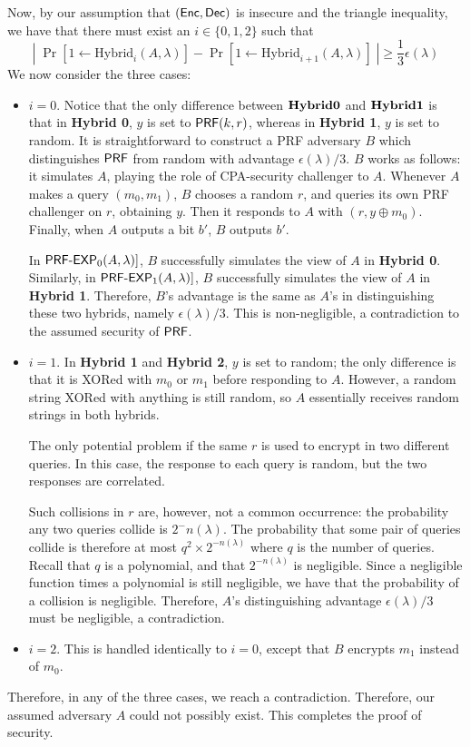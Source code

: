 Now, by our assumption that $({\sf Enc},{\sf Dec})$ is insecure and the triangle inequality, we have that there must exist an $i\in\{0,1,2\}$ such that 
\[|\;\Pr[1\gets\text{Hybrid}_i(A,\lambda)]-\Pr[1\gets\text{Hybrid}_{i+1}(A,\lambda)]\;|\geq \frac{1}{3}\epsilon(\lambda)\]
We now consider the three cases:
\begin{itemize}
	\item $i=0$.  Notice that the only difference between ${\bf Hybrid 0}$ and ${\bf Hybrid 1}$ is that in {\bf Hybrid 0}, $y$ is set to ${\sf PRF}(k,r)$, whereas in {\bf Hybrid 1}, $y$ is set to random.  It is straightforward to construct a PRF adversary $B$ which distinguishes ${\sf PRF}$ from random with advantage $\epsilon(\lambda)/3$.  $B$ works as follows: it simulates $A$, playing the role of CPA-security challenger to $A$.  Whenever $A$ makes a query $(m_0,m_1)$, $B$ chooses a random $r$, and queries its own PRF challenger on $r$, obtaining $y$.  Then it responds to $A$ with $(r,y\oplus m_0)$.  Finally, when $A$ outputs a bit $b'$, $B$ outputs $b'$.
	
	In $\text{\sf PRF-EXP}_0(A,\lambda)]$, $B$ successfully simulates the view of $A$ in {\bf Hybrid 0}.  Similarly, in $\text{\sf PRF-EXP}_1(A,\lambda)]$, $B$ successfully simulates the view of $A$ in {\bf Hybrid 1}.  Therefore, $B$'s advantage is the same as $A$'s in distinguishing these two hybrids, namely $\epsilon(\lambda)/3$.  This is non-negligible, a contradiction to the assumed security of ${\sf PRF}$.
	
	\item $i=1$.  In {\bf Hybrid 1} and {\bf Hybrid 2}, $y$ is set to random; the only difference is that it is XORed with $m_0$ or $m_1$ before responding to $A$.  However, a random string XORed with anything is still random, so $A$ essentially receives random strings in both hybrids.
	
	The only potential problem if the same $r$ is used to encrypt in two different queries.  In this case, the response to each query is random, but the two responses are correlated.  
	
	Such collisions in $r$ are, however, not a common occurrence: the probability any two queries collide is $2^-n(\lambda)$.  The probability that some pair of queries collide is therefore at most $q^2\times 2^{-n(\lambda)}$ where $q$ is the number of queries.  Recall that $q$ is a polynomial, and that $2^{-n(\lambda)}$ is negligible.  Since a negligible function times a polynomial is still negligible, we have that the probability of a collision is negligible.  Therefore, $A$'s distinguishing advantage $\epsilon(\lambda)/3$ must be negligible, a contradiction.
	\item $i=2$.  This is handled identically to $i=0$, except that $B$ encrypts $m_1$ instead of $m_0$.
\end{itemize}

Therefore, in any of the three cases, we reach a contradiction.  Therefore, our assumed adversary $A$ could not possibly exist.  This completes the proof of security.

